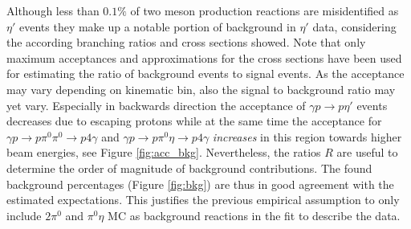 Although less than $0.1\%$ of two meson production reactions are misidentified as $\eta'$ events they make up a notable portion of background in $\eta'$ data, considering the according branching ratios and cross sections showed. Note that only maximum acceptances and approximations for the cross sections have been used for estimating the  ratio of background events to signal events. As the acceptance may vary depending on kinematic bin, also the signal to background ratio may yet vary. Especially in backwards direction the acceptance of $\gamma p \to p\eta'$ events decreases due to escaping protons while at the same time the acceptance for $\gamma p \to p\pi^0\pi^0\to p4\gamma$ and $\gamma p \to p \pi^0\eta\to p 4\gamma$ \emph{increases} in this region towards higher beam energies, see Figure \ref{fig:acc_bkg}. Nevertheless, the ratios $R$ are useful to determine the order of magnitude of background contributions. The found background percentages (Figure \ref{fig:bkg}) are thus in good agreement with the estimated expectations. This justifies the previous empirical assumption to only include $2\pi^0$ and $\pi^0\eta$ MC as background reactions in the fit to describe the data.   
